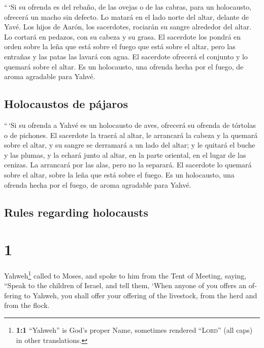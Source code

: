 \begin{paracol}{2}
 ``\,`Si su ofrenda es del rebaño, de las ovejas o de las
cabras, para un holocausto, ofrecerá un macho sin defecto.
 Lo matará en el lado norte del altar, delante de Yavé.
Los hijos de Aarón, los sacerdotes, rociarán su sangre alrededor del
altar.  Lo cortará en pedazos, con su cabeza y su grasa.
El sacerdote los pondrá en orden sobre la leña que está sobre el fuego
que está sobre el altar,  pero las entrañas y las patas
las lavará con agua. El sacerdote ofrecerá el conjunto y lo quemará
sobre el altar. Es un holocausto, una ofrenda hecha por el fuego, de
aroma agradable para Yahvé.

\hypertarget{holocaustos-de-puxe1jaros}{%
\subsection{Holocaustos de pájaros}\label{holocaustos-de-puxe1jaros}}

 ``\,`Si su ofrenda a Yahvé es un holocausto de aves,
ofrecerá su ofrenda de tórtolas o de pichones.  El
sacerdote la traerá al altar, le arrancará la cabeza y la quemará sobre
el altar, y su sangre se derramará a un lado del altar; 
y le quitará el buche y las plumas, y la echará junto al altar, en la
parte oriental, en el lugar de las cenizas.  La arrancará
por las alas, pero no la separará. El sacerdote lo quemará sobre el
altar, sobre la leña que está sobre el fuego. Es un holocausto, una
ofrenda hecha por el fuego, de aroma agradable para Yahvé.

\switchcolumn
\begin{otherlanguage}{english}

\hypertarget{rules-regarding-holocausts}{%
\subsection{Rules regarding
holocausts}\label{rules-regarding-holocausts}}

\hypertarget{section-1}{%
\section{1}\label{section-1}}

 Yahweh\footnote{\textbf{1:1} ``Yahweh'' is God's proper
  Name, sometimes rendered ``\textsc{Lord}'' (all caps) in other
  translations.} called to Moses, and spoke to him from the Tent of
Meeting, saying,  ``Speak to the children of Israel, and
tell them, `When anyone of you offers an offering to Yahweh, you shall
offer your offering of the livestock, from the herd and from the flock.


\end{otherlanguage}
\end{paracol}
